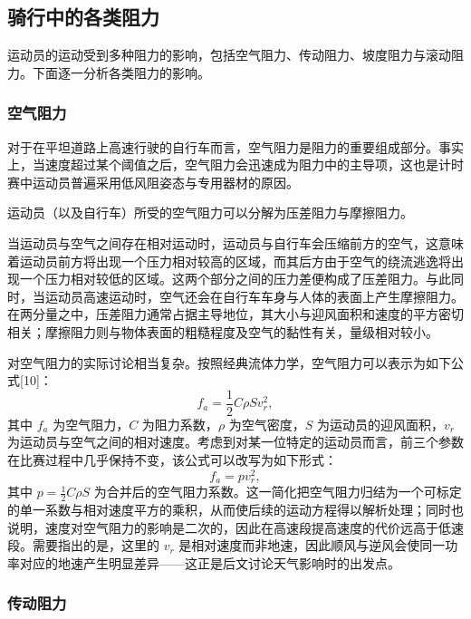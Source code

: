 \documentclass[11pt,a4paper]{ctexart}
\begin{document}
\subsection{骑行中的各类阻力}

运动员的运动受到多种阻力的影响，包括空气阻力、传动阻力、坡度阻力与滚动阻力。下面逐一分析各类阻力的影响。

\subsubsection{空气阻力}

对于在平坦道路上高速行驶的自行车而言，空气阻力是阻力的重要组成部分。事实上，当速度超过某个阈值之后，空气阻力会迅速成为阻力中的主导项，这也是计时赛中运动员普遍采用低风阻姿态与专用器材的原因。

运动员（以及自行车）所受的空气阻力可以分解为压差阻力与摩擦阻力。

当运动员与空气之间存在相对运动时，运动员与自行车会压缩前方的空气，这意味着运动员前方将出现一个压力相对较高的区域，而其后方由于空气的绕流逃逸将出现一个压力相对较低的区域。这两个部分之间的压力差便构成了压差阻力。与此同时，当运动员高速运动时，空气还会在自行车车身与人体的表面上产生摩擦阻力。在两分量之中，压差阻力通常占据主导地位，其大小与迎风面积和速度的平方密切相关；摩擦阻力则与物体表面的粗糙程度及空气的黏性有关，量级相对较小。

对空气阻力的实际讨论相当复杂。按照经典流体力学，空气阻力可以表示为如下公式[10]：
\begin{equation}
f_a=\frac{1}{2}C\rho S v_r^{2},
\end{equation}
其中 $f_a$ 为空气阻力，$C$ 为阻力系数，$\rho$ 为空气密度，$S$ 为运动员的迎风面积，$v_r$ 为运动员与空气之间的相对速度。考虑到对某一位特定的运动员而言，前三个参数在比赛过程中几乎保持不变，该公式可以改写为如下形式：
\begin{equation}
f_a=p v_r^{2},
\end{equation}
其中 $p=\frac{1}{2}C\rho S$ 为合并后的空气阻力系数。这一简化把空气阻力归结为一个可标定的单一系数与相对速度平方的乘积，从而使后续的运动方程得以解析处理；同时也说明，速度对空气阻力的影响是二次的，因此在高速段提高速度的代价远高于低速段。需要指出的是，这里的 $v_r$ 是相对速度而非地速，因此顺风与逆风会使同一功率对应的地速产生明显差异——这正是后文讨论天气影响时的出发点。

\subsubsection{传动阻力}
\end{document}
